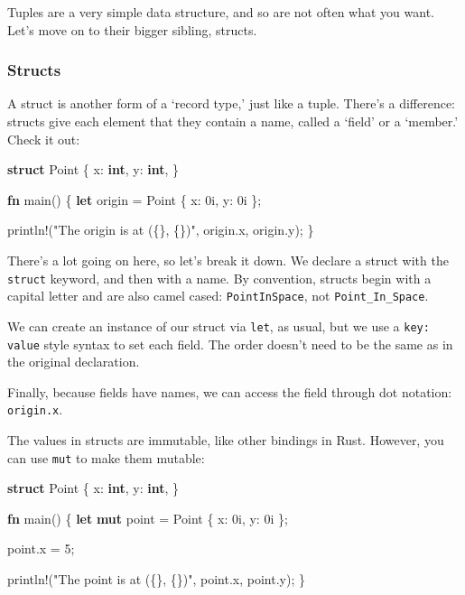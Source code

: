 \documentclass[]{article}
\newenvironment{Shaded}{}{}
\newcommand{\KeywordTok}[1]{\textcolor[rgb]{0.00,0.44,0.13}{\textbf{{#1}}}}
\newcommand{\DecValTok}[1]{\textcolor[rgb]{0.25,0.63,0.44}{{#1}}}
\newcommand{\StringTok}[1]{\textcolor[rgb]{0.25,0.44,0.63}{{#1}}}
\newcommand{\OtherTok}[1]{\textcolor[rgb]{0.00,0.44,0.13}{{#1}}}
\newcommand{\NormalTok}[1]{{#1}}
\begin{document}
Tuples are a very simple data structure, and so are not often what you
want. Let's move on to their bigger sibling, structs.

\subsubsection{Structs}\label{structs}

A struct is another form of a `record type,' just like a tuple. There's
a difference: structs give each element that they contain a name, called
a `field' or a `member.' Check it out:

\begin{Shaded}
\begin{Highlighting}[]
\KeywordTok{struct} \NormalTok{Point \{}
    \NormalTok{x: }\KeywordTok{int}\NormalTok{,}
    \NormalTok{y: }\KeywordTok{int}\NormalTok{,}
\NormalTok{\}}

\KeywordTok{fn} \NormalTok{main() \{}
    \KeywordTok{let} \NormalTok{origin = Point \{ x: }\DecValTok{0i}\NormalTok{, y:  }\DecValTok{0i} \NormalTok{\};}

    \OtherTok{println!}\NormalTok{(}\StringTok{"The origin is at (\{\}, \{\})"}\NormalTok{, origin.x, origin.y);}
\NormalTok{\}}
\end{Highlighting}
\end{Shaded}

There's a lot going on here, so let's break it down. We declare a struct
with the \texttt{struct} keyword, and then with a name. By convention,
structs begin with a capital letter and are also camel cased:
\texttt{PointInSpace}, not \texttt{Point\_In\_Space}.

We can create an instance of our struct via \texttt{let}, as usual, but
we use a \texttt{key: value} style syntax to set each field. The order
doesn't need to be the same as in the original declaration.

Finally, because fields have names, we can access the field through dot
notation: \texttt{origin.x}.

The values in structs are immutable, like other bindings in Rust.
However, you can use \texttt{mut} to make them mutable:

\begin{Shaded}
\begin{Highlighting}[]
\KeywordTok{struct} \NormalTok{Point \{}
    \NormalTok{x: }\KeywordTok{int}\NormalTok{,}
    \NormalTok{y: }\KeywordTok{int}\NormalTok{,}
\NormalTok{\}}

\KeywordTok{fn} \NormalTok{main() \{}
    \KeywordTok{let} \KeywordTok{mut} \NormalTok{point = Point \{ x: }\DecValTok{0i}\NormalTok{, y:  }\DecValTok{0i} \NormalTok{\};}

    \NormalTok{point.x = }\DecValTok{5}\NormalTok{;}

    \OtherTok{println!}\NormalTok{(}\StringTok{"The point is at (\{\}, \{\})"}\NormalTok{, point.x, point.y);}
\NormalTok{\}}
\end{Highlighting}
\end{Shaded}
\end{document}
